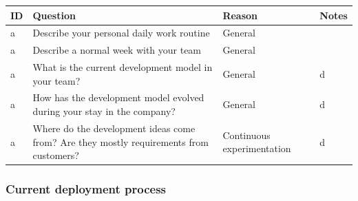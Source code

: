 \documentclass[english]{tktltiki2}
\theoremstyle{definition}
\theoremstyle{remark}
\begin{document}
\begin{center}
    \begin{tabular}{ | l | l | l | p{5cm} |}
    \hline
    ID & Question & Reason & Notes \\ \hline
    a & Describe your personal daily work routine & General & \\ \hline
    a & Describe a normal week with your team & General & \\ \hline
    a & What is the current development model in your team? & General & d \\ \hline
    a & How has the development model evolved during your stay in the company? & General & d \\ \hline
    a & Where do the development ideas come from? Are they mostly requirements from customers? & Continuous experimentation & d \\ \hline
    \hline
    \end{tabular}
\end{center}

\subsubsection{Current deployment process}
\end{document}
